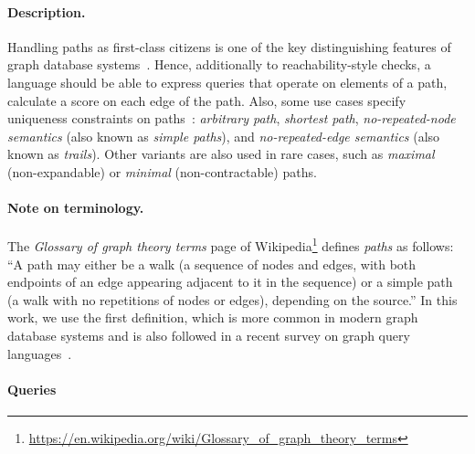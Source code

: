 
\paragraph{Description.}

Handling paths as first-class citizens is one of the key distinguishing features of graph database
systems~\cite{DBLP:conf/sigmod/AnglesABBFGLPPS18}. Hence, additionally to
reachability-style checks, a language should be able to express
queries that operate on elements of a path, \eg calculate a score on each edge
of the path.
Also, some use cases specify uniqueness constraints on paths~\cite{DBLP:journals/csur/AnglesABHRV17}:
\emph{arbitrary path},
\emph{shortest path},
\emph{no-repeated-node semantics} (also known as \emph{simple paths}), and
\emph{no-repeated-edge semantics} (also known as \emph{trails}).
Other variants are also used in rare cases, such as \emph{maximal} (non-expandable) or \emph{minimal} (non-contractable) paths.

\paragraph{Note on terminology.}

The \emph{Glossary of graph theory terms} page of Wikipedia\footnote{\url{https://en.wikipedia.org/wiki/Glossary_of_graph_theory_terms}} defines \emph{paths} as follows: ``A path may either be a walk (a sequence of nodes and edges, with both endpoints of an edge appearing adjacent to it in the sequence) or a simple path (a walk with no repetitions of nodes or edges), depending on the source.''
In this work, we use the first definition, which is more common in modern graph database systems and is also followed in a recent survey on graph query languages~\cite{DBLP:journals/csur/AnglesABHRV17}.


\paragraph{Queries}
{\raggedright

}